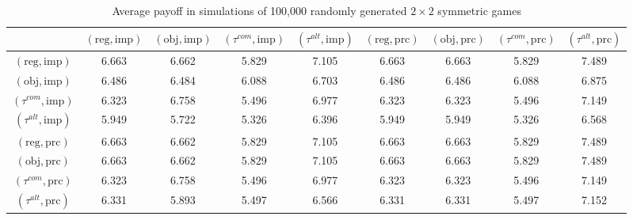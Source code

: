 \documentclass[fleqn,reqno,11pt]{article}
\begin{document}
\begin{table}[]
\centering
\footnotesize
\begin{tabular}{ccccccccc}
  \hline
 & $(\text{reg}, \text{imp})$ 
 & $(\text{obj}, \text{imp})$ 
 & $(\tau^{com}, \text{imp})$
 & $(\tau^{alt}, \text{imp})$
 & $(\text{reg}, \text{prc})$ 
 & $(\text{obj}, \text{prc})$ 
 & $(\tau^{com}, \text{prc})$
 & $(\tau^{alt}, \text{prc})$ \\ 
  \hline
  $(\text{reg}, \text{imp})$ & 6.663 & 6.662 & 5.829 & 7.105 & 6.663 & 6.663 & 5.829 & 7.489 \\
  $(\text{obj}, \text{imp})$ & 6.486 & 6.484 & 6.088 & 6.703 & 6.486 & 6.486 & 6.088 & 6.875 \\
  $(\tau^{com}, \text{imp})$ & 6.323 & 6.758 & 5.496 & 6.977 & 6.323 & 6.323 & 5.496 & 7.149 \\
  $(\tau^{alt}, \text{imp})$ & 5.949 & 5.722 & 5.326 & 6.396 & 5.949 & 5.949 & 5.326 & 6.568 \\
  $(\text{reg}, \text{prc})$ & 6.663 & 6.662 & 5.829 & 7.105 & 6.663 & 6.663 & 5.829 & 7.489 \\
  $(\text{obj}, \text{prc})$ & 6.663 & 6.662 & 5.829 & 7.105 & 6.663 & 6.663 & 5.829 & 7.489 \\
  $(\tau^{com}, \text{prc})$ & 6.323 & 6.758 & 5.496 & 6.977 & 6.323 & 6.323 & 5.496 & 7.149 \\
  $(\tau^{alt}, \text{prc})$ & 6.331 & 5.893 & 5.497 & 6.566 & 6.331 & 6.331 & 5.497 & 7.152 \\
   \hline                          
\end{tabular}                      
\caption{Average payoff in simulations of 100,000
  randomly generated $2 \times 2$ symmetric games}
\label{tab:ExpectedFitness_2x2_Full}        
\end{table}   
 
 
\end{document}
